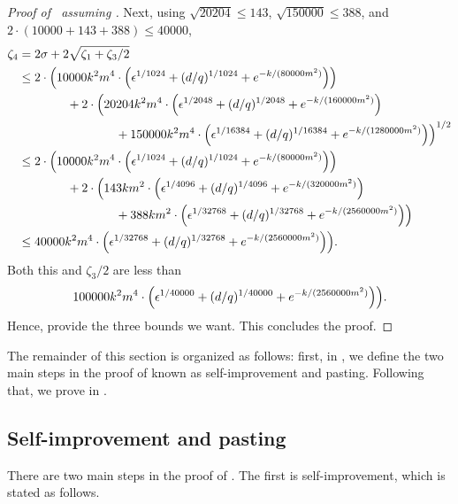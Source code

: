 \begin{proof}[Proof of~ assuming ]
Next, using $\sqrt{20204} \leq 143$, $\sqrt{150000} \leq 388$, and $2 \cdot (10000+143+388) \leq 40000$,
\begin{align*}
\zeta_4  &= 2\sigma + 2 \sqrt{\zeta_1 + \zeta_3/2}\\
& \leq 2 \cdot \Big(10000 k^2 m^4 \cdot \Big(\epsilon^{1/1024} +  (d/q)^{1/1024} + e^{-k/(80000m^2)}\Big)\Big)\\
& \qquad \qquad + 2 \cdot \Big(20204 k^2 m^4 \cdot \Big(\epsilon^{1/2048} +  (d/q)^{1/2048} + e^{-k/(160000m^2)}\Big) \\
& \qquad \qquad \qquad  \qquad+ 150000 k^2 m^4 \cdot \Big(\epsilon^{1/16384} + (d/q)^{1/16384} + e^{-k/(1280000m^2)}\Big)\Big)^{1/2}\\
& \leq 2 \cdot \Big(10000 k^2 m^4 \cdot \Big(\epsilon^{1/1024} +  (d/q)^{1/1024} + e^{-k/(80000m^2)}\Big)\Big)\\
& \qquad \qquad + 2 \cdot \Big(143 k m^2 \cdot \Big(\epsilon^{1/4096} +  (d/q)^{1/4096} + e^{-k/(320000m^2)}\Big) \\
& \qquad \qquad \qquad  \qquad+ 388 k m^2 \cdot \Big(\epsilon^{1/32768} + (d/q)^{1/32768} + e^{-k/(2560000m^2)}\Big)\Big)\\
& \leq 40000k^2m^4 \cdot\Big(\epsilon^{1/32768} + (d/q)^{1/32768} + e^{-k/(2560000m^2)}\Big)\Big).
\end{align*}
Both this and $\zeta_3/2$ are less than
\begin{equation*}
100000k^2m^4 \cdot\Big(\epsilon^{1/40000} + (d/q)^{1/40000} + e^{-k/(2560000m^2)}\Big)\Big).
\end{equation*}
Hence,  provide the three bounds we want.
This concludes the proof.
\end{proof}


The remainder of this section is organized as follows:
first, in , we define the two main steps in the proof of 
known as self-improvement and pasting.
Following that, we prove  in .

\subsection{Self-improvement and pasting}\label{sec:self-improvement-and-pasting}

There are two main steps in the proof of .
The first is self-improvement, which is stated as follows.

